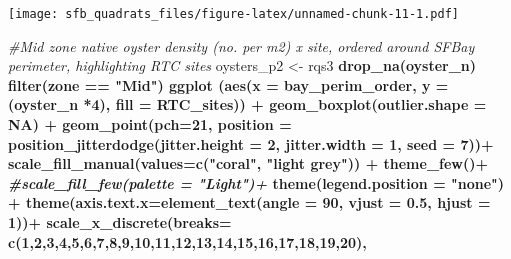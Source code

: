 \documentclass[
]{article}
\newenvironment{Shaded}{\begin{snugshade}}{\end{snugshade}}
\newcommand{\CommentTok}[1]{\textcolor[rgb]{0.56,0.35,0.01}{\textit{#1}}}
\newcommand{\DataTypeTok}[1]{\textcolor[rgb]{0.13,0.29,0.53}{#1}}
\newcommand{\DecValTok}[1]{\textcolor[rgb]{0.00,0.00,0.81}{#1}}
\newcommand{\FloatTok}[1]{\textcolor[rgb]{0.00,0.00,0.81}{#1}}
\newcommand{\KeywordTok}[1]{\textcolor[rgb]{0.13,0.29,0.53}{\textbf{#1}}}
\newcommand{\NormalTok}[1]{#1}
\newcommand{\OperatorTok}[1]{\textcolor[rgb]{0.81,0.36,0.00}{\textbf{#1}}}
\newcommand{\OtherTok}[1]{\textcolor[rgb]{0.56,0.35,0.01}{#1}}
\newcommand{\StringTok}[1]{\textcolor[rgb]{0.31,0.60,0.02}{#1}}
\begin{document}
\texttt{[image: sfb\_quadrats\_files/figure-latex/unnamed-chunk-11-1.pdf]}

\begin{Shaded}
\begin{Highlighting}[]
\CommentTok{#Mid zone native oyster density (no. per m2) x site, ordered around SFBay perimeter, highlighting RTC sites}
\NormalTok{oysters_p2 <-}\StringTok{ }\NormalTok{rqs3 }\OperatorTok{%>%}
\StringTok{  }\KeywordTok{drop_na}\NormalTok{(oyster_n) }\OperatorTok{%>%}\StringTok{ }
\StringTok{  }\KeywordTok{filter}\NormalTok{(zone }\OperatorTok{==}\StringTok{ "Mid"}\NormalTok{) }\OperatorTok{%>%}\StringTok{ }
\StringTok{  }\KeywordTok{ggplot}\NormalTok{ (}\KeywordTok{aes}\NormalTok{(}\DataTypeTok{x =}\NormalTok{ bay_perim_order, }\DataTypeTok{y =}\NormalTok{ (oyster_n }\OperatorTok{*}\DecValTok{4}\NormalTok{), }\DataTypeTok{fill =}\NormalTok{ RTC_sites)) }\OperatorTok{+}
\StringTok{  }\KeywordTok{geom_boxplot}\NormalTok{(}\DataTypeTok{outlier.shape =} \OtherTok{NA}\NormalTok{) }\OperatorTok{+}
\StringTok{  }\KeywordTok{geom_point}\NormalTok{(}\DataTypeTok{pch=}\DecValTok{21}\NormalTok{, }\DataTypeTok{position =} \KeywordTok{position_jitterdodge}\NormalTok{(}\DataTypeTok{jitter.height =} \DecValTok{2}\NormalTok{, }\DataTypeTok{jitter.width =} \DecValTok{1}\NormalTok{, }\DataTypeTok{seed =} \DecValTok{7}\NormalTok{))}\OperatorTok{+}
\StringTok{  }\KeywordTok{scale_fill_manual}\NormalTok{(}\DataTypeTok{values=}\KeywordTok{c}\NormalTok{(}\StringTok{"coral"}\NormalTok{, }\StringTok{"light grey"}\NormalTok{)) }\OperatorTok{+}
\StringTok{  }\KeywordTok{theme_few}\NormalTok{()}\OperatorTok{+}
\StringTok{  }\CommentTok{#scale_fill_few(palette = "Light")+}
\StringTok{  }\KeywordTok{theme}\NormalTok{(}\DataTypeTok{legend.position =} \StringTok{"none"}\NormalTok{) }\OperatorTok{+}
\StringTok{  }\KeywordTok{theme}\NormalTok{(}\DataTypeTok{axis.text.x=}\KeywordTok{element_text}\NormalTok{(}\DataTypeTok{angle =} \DecValTok{90}\NormalTok{, }\DataTypeTok{vjust =} \FloatTok{0.5}\NormalTok{, }\DataTypeTok{hjust =} \DecValTok{1}\NormalTok{))}\OperatorTok{+}
\StringTok{  }\KeywordTok{scale_x_discrete}\NormalTok{(}\DataTypeTok{breaks=} \KeywordTok{c}\NormalTok{(}\DecValTok{1}\NormalTok{,}\DecValTok{2}\NormalTok{,}\DecValTok{3}\NormalTok{,}\DecValTok{4}\NormalTok{,}\DecValTok{5}\NormalTok{,}\DecValTok{6}\NormalTok{,}\DecValTok{7}\NormalTok{,}\DecValTok{8}\NormalTok{,}\DecValTok{9}\NormalTok{,}\DecValTok{10}\NormalTok{,}\DecValTok{11}\NormalTok{,}\DecValTok{12}\NormalTok{,}\DecValTok{13}\NormalTok{,}\DecValTok{14}\NormalTok{,}\DecValTok{15}\NormalTok{,}\DecValTok{16}\NormalTok{,}\DecValTok{17}\NormalTok{,}\DecValTok{18}\NormalTok{,}\DecValTok{19}\NormalTok{,}\DecValTok{20}\NormalTok{), }
}}}
\end{Highlighting}
\end{Shaded}
\end{document}
